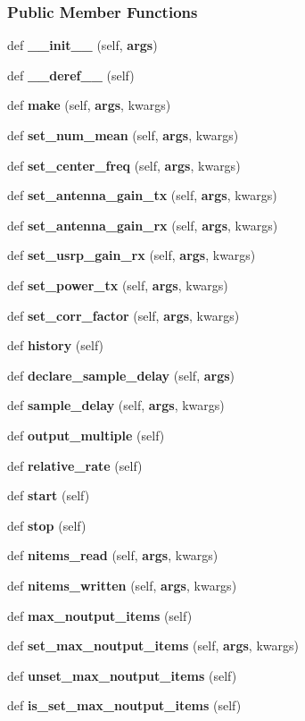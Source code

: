 \subsubsection*{Public Member Functions}
\begin{DoxyCompactItemize}
\item 
def {\bf \+\_\+\+\_\+init\+\_\+\+\_\+} (self, {\bf args})
\item 
def {\bf \+\_\+\+\_\+deref\+\_\+\+\_\+} (self)
\item 
def {\bf make} (self, {\bf args}, kwargs)
\item 
def {\bf set\+\_\+num\+\_\+mean} (self, {\bf args}, kwargs)
\item 
def {\bf set\+\_\+center\+\_\+freq} (self, {\bf args}, kwargs)
\item 
def {\bf set\+\_\+antenna\+\_\+gain\+\_\+tx} (self, {\bf args}, kwargs)
\item 
def {\bf set\+\_\+antenna\+\_\+gain\+\_\+rx} (self, {\bf args}, kwargs)
\item 
def {\bf set\+\_\+usrp\+\_\+gain\+\_\+rx} (self, {\bf args}, kwargs)
\item 
def {\bf set\+\_\+power\+\_\+tx} (self, {\bf args}, kwargs)
\item 
def {\bf set\+\_\+corr\+\_\+factor} (self, {\bf args}, kwargs)
\item 
def {\bf history} (self)
\item 
def {\bf declare\+\_\+sample\+\_\+delay} (self, {\bf args})
\item 
def {\bf sample\+\_\+delay} (self, {\bf args}, kwargs)
\item 
def {\bf output\+\_\+multiple} (self)
\item 
def {\bf relative\+\_\+rate} (self)
\item 
def {\bf start} (self)
\item 
def {\bf stop} (self)
\item 
def {\bf nitems\+\_\+read} (self, {\bf args}, kwargs)
\item 
def {\bf nitems\+\_\+written} (self, {\bf args}, kwargs)
\item 
def {\bf max\+\_\+noutput\+\_\+items} (self)
\item 
def {\bf set\+\_\+max\+\_\+noutput\+\_\+items} (self, {\bf args}, kwargs)
\item 
def {\bf unset\+\_\+max\+\_\+noutput\+\_\+items} (self)
\item 
def {\bf is\+\_\+set\+\_\+max\+\_\+noutput\+\_\+items} (self)
\item 

\end{DoxyCompactItemize}
